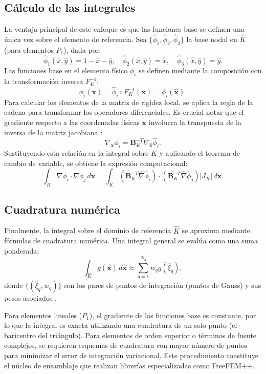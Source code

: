 \documentclass[12pt, letterpaper]{report}
\theoremstyle{definition}
\begin{document}
\subsection{Cálculo de las integrales}

La ventaja principal de este enfoque es que las funciones base se definen una única vez sobre el elemento de referencia. Sea $\{\hat{\phi}_1, \hat{\phi}_2, \hat{\phi}_3\}$ la base nodal en $\hat{K}$ (para elementos $P_1$), dada por:
\[
\hat{\phi}_1(\hat{x}, \hat{y}) = 1 - \hat{x} - \hat{y}, \quad \hat{\phi}_2(\hat{x}, \hat{y}) = \hat{x}, \quad \hat{\phi}_3(\hat{x}, \hat{y}) = \hat{y}.
\]
Las funciones base en el elemento físico $\phi_i$ se definen mediante la composición con la transformación inversa $F_K^{-1}$:
\[
\phi_i(\mathbf{x}) = \hat{\phi}_i \circ F_K^{-1}(\mathbf{x}) = \hat{\phi}_i(\hat{\mathbf{x}}).
\]
Para calcular los elementos de la matriz de rigidez local, se aplica la regla de la cadena para transformar los operadores diferenciales. Es crucial notar que el gradiente respecto a las coordenadas físicas $\mathbf{x}$ involucra la transpuesta de la inversa de la matriz jacobiana \cite{hughes2012finite}:
\[
\nabla_{\mathbf{x}} \phi_i = \mathbf{B}_K^{-T} \hat{\nabla}_{\hat{\mathbf{x}}} \hat{\phi}_i.
\]
Sustituyendo esta relación en la integral sobre $K$ y aplicando el teorema de cambio de variable, se obtiene la expresión computacional:
\begin{equation}
    \int_K \nabla \phi_i \cdot \nabla \phi_j \, d\mathbf{x} = \int_{\hat{K}} \left( \mathbf{B}_K^{-T} \hat{\nabla} \hat{\phi}_i \right) \cdot \left( \mathbf{B}_K^{-T} \hat{\nabla} \hat{\phi}_j \right) |J_K| \, d\hat{\mathbf{x}}.
\end{equation}

\subsection{Cuadratura numérica}

Finalmente, la integral sobre el dominio de referencia $\hat{K}$ se aproxima mediante fórmulas de cuadratura numérica. Una integral general se evalúa como una suma ponderada:
\begin{equation}
    \int_{\hat{K}} g(\hat{\mathbf{x}}) \, d\hat{\mathbf{x}} \approx \sum_{q=1}^{N_q} w_q g(\hat{\xi}_q),
\end{equation}
donde $\{(\hat{\xi}_q, w_q)\}$ son los pares de puntos de integración (puntos de Gauss) y sus pesos asociados \cite{quarteroni2008numerical}.

Para elementos lineales ($P_1$), el gradiente de las funciones base es constante, por lo que la integral es exacta utilizando una cuadratura de un solo punto (el baricentro del triángulo). Para elementos de orden superior o términos de fuente complejos, se requieren esquemas de cuadratura con mayor número de puntos para minimizar el error de integración variacional. Este procedimiento constituye el núcleo de ensamblaje que realizan librerías especializadas como FreeFEM++.
\end{document}
